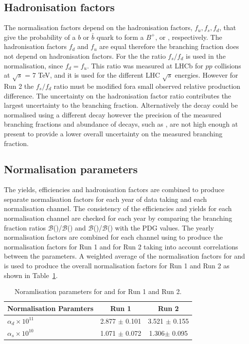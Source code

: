 {{\subsection{Hadronisation factors}

The normalisation factors depend on the hadronisation factors, $f_{u}, f_{s}, f_{d}$, that give the probability of a $b$ or $\bar{b}$ quark to form a $B^{+}$, \bs or \bd, respectively. The hadronisation factors $f_{d}$ and $f_{u}$ are equal therefore the \bdmumu branching fraction does not depend on hadronisation factors. For the \bsmumu the ratio $f_{s}/f_{d}$ is used in the normalisation, since $f_{d} = f_{u}$. This ratio was measured at LHCb for $pp$ collisions at $\sqrt{s}$ = 7 TeV, and it is used for the different LHC $\sqrt{s}$ energies. However for Run 2 the $f_{s}/f_{d}$ ratio must be modified fora small observed relative production difference. 
The uncertainty on the hadronisation factor ratio contributes the largest uncertainty to the \bsmumu branching fraction. Alternatively the \bsmumu decay could be normalised using a different \bs decay however the precision of the measured branching fractions and abundance of \bs decays, such as \bsjpsiphi, are not high enough at present to provide a lower overall uncertainty on the measured branching fraction.

\subsection{Normalisation parameters}

The yields, efficiencies and hadronisation factors are combined to produce separate normalisation factors for each year of data taking and each normalisation channel. The consistency of the efficiencies and yields for each normalisation channel are checked for each year by comparing the branching fraction ratios $\mathcal{B}$(\bdkpi)/$\mathcal{B}$(\bujpsik) and $\mathcal{B}$(\bujpsik)/$\mathcal{B}$(\bsjpsiphi) with the PDG values. The yearly normalisation factors are combined for each channel using to produce the normalisation factors for Run 1 and for Run 2 taking into account correlations between the parameters. A weighted average of the normalisation factors for \bdkpi and \bujpsiK is used to produce the overall normalisation factors for Run 1 and Run 2 as shown in Table~\ref{tab:normparams}.

\begin{table}[htbp]
\begin{center}
\begin{tabular}{lcc}
\hline
Normalisation Paramters & Run 1 & Run 2 \\ \hline
$\alpha_{d} \times 10^{11}$ & 2.877 $\pm$ 0.101 & 3.521 $\pm$ 0.155 \\ %
$\alpha_{s} \times 10^{10}$ & 1.071 $\pm$ 0.072 & 1.306$ \pm$ 0.095 \\
\hline
\end{tabular}
\vspace{0.7cm}
\caption{Noramlisation parameters for \bsmumu and \bdmumu for Run 1 and Run 2.}
\label{tab:normparams}
\end{center}
\vspace{-1.0cm}
\end{table}


}}
